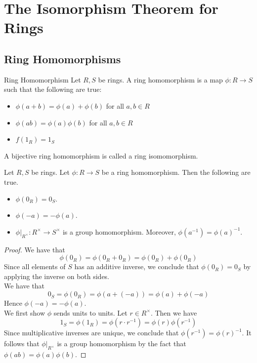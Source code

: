 \documentclass[a4paper]{article}
\begin{document}
\pagebreak
\section{The Isomorphism Theorem for Rings}
\subsection{Ring Homomorphisms}
\begin{defn}{Ring Homomorphism}{} Let $R,S$ be rings. A ring homomorphism is a map $\phi:R\to S$ such that the following are true: 
\begin{itemize}
\item $\phi(a+b)=\phi(a)+\phi(b)$ for all $a,b\in R$
\item $\phi(ab)=\phi(a)\phi(b)$ for all $a,b\in R$
\item $f(1_R)=1_S$
\end{itemize}
A bijective ring homomorphism is called a ring isomomorphism. 
\end{defn}

\begin{lmm}{}{} Let $R,S$ be rings. Let $\phi:R\to S$ be a ring homomorphism. Then the following are true. 
\begin{itemize}
\item $\phi(0_R)=0_S$. 
\item $\phi(-a)=-\phi(a)$. 
\item $\phi|_{R^\times}:R^\times\to S^\times$ is a group homomorphism. Moreover, $\phi(a^{-1})=\phi(a)^{-1}$. 
\end{itemize} 
\begin{proof}
We have that $$\phi(0_R)=\phi(0_R+0_R)=\phi(0_R)+\phi(0_R)$$ Since all elements of $S$ has an additive inverse, we conclude that $\phi(0_R)=0_S$ by applying the inverse on both sides. \\

We have that $$0_S=\phi(0_R)=\phi(a+(-a))=\phi(a)+\phi(-a)$$ Hence $\phi(-a)=-\phi(a)$. \\

We first show $\phi$ sends units to units. Let $r\in R^\times$. Then we have $$1_S=\phi(1_R)=\phi(r\cdot r^{-1})=\phi(r)\phi(r^{-1})$$ Since multiplicative inverses are unique, we conclude that $\phi(r^{-1})=\phi(r)^{-1}$. It follows that $\phi|_{R^\times}$ is a group homomorphism by the fact that $\phi(ab)=\phi(a)\phi(b)$. 
\end{proof}
\end{lmm}
\end{document}
